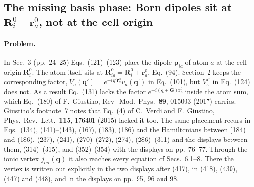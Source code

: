 
\subsection*{The missing basis phase: Born dipoles sit at $\mathbf R_i^0+\mathbf r_a^0$, not at the cell origin}

\paragraph{Problem.}
In Sec.~3 (pp.~24--25) Eqs.~(121)--(123) place the dipole $\mathbf p_{ia}$ of atom $a$ at the cell origin $\mathbf R^0_i$. The atom itself sits at $\mathbf R^0_{ia}=\mathbf R^0_i+\mathbf r^0_a$, Eq.~(94). Section~2 keeps the corresponding factor, $V_a(\mathbf q')=e^{-i\mathbf q'\mathbf r^0_a}v_a(\mathbf q')$ in Eq.~(101), but $V^{\mathcal L}_a$ in Eq.~(124) does not. As a result Eq.~(131) lacks the factor $e^{-i(\mathbf q+\mathbf G)\mathbf r^0_a}$ inside the atom sum, which Eq.~(180) of F.~Giustino, Rev.\ Mod.\ Phys.\ \textbf{89}, 015003 (2017) carries. Giustino's footnote~7 notes that Eq.~(4) of C.~Verdi and F.~Giustino, Phys.\ Rev.\ Lett.\ \textbf{115}, 176401 (2015) lacked it too. The same placement recurs in Eqs.~(134), (141)--(143), (167), (183), (186) and the Hamiltonians between (184) and (186), (237), (241), (270)--(272), (274), (286)--(311) and the displays between them, (314)--(315), and (352)--(354) with the displays on pp.~76--77. Through the ionic vertex $j_{\alpha\sigma}(\mathbf q)$ it also reaches every equation of Secs.~6.1--8. There the vertex is written out explicitly in the two displays after (417), in (418), (430), (447) and (448), and in the displays on pp.~95, 96 and 98.

